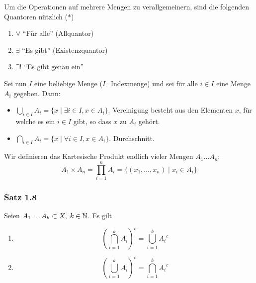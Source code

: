 Um die Operationen auf mehrere Mengen zu verallgemeinern, sind die folgenden Quantoren nützlich ($\ast$)
\begin{enumerate}
\item $\forall$ ``Für alle'' (Allquantor)
\item $\exists$ ``Es gibt'' (Existenzquantor)
\item $\exists !$ ``Es gibt genau ein''
\end{enumerate}
Sei nun $I$ eine beliebige Menge ($I$=Indexmenge) und sei für alle $i\in I$ eine Menge $A_i$ gegeben. Dann:
\begin{itemize}
\item $\mathop{\bigcup}\limits_{i \in I}{A_i} = \{x\mid \exists i\in I,x\in A_i\}$. Vereinigung besteht aus den Elementen $x$, für welche es ein $i\in I$ gibt, so dass $x$ zu $A_i$ gehört.
\item  $\mathop{\bigcap}\limits_{i \in I}{A_i} = \{x\mid \forall i\in I,x\in A_i\}$. Durchschnitt. 
\end{itemize}
Wir definieren das Kartesische Produkt endlich vieler Mengen $A_1 \dots A_n$: \[{A_1} \times {A_n} = \prod\limits_{i = 1}^n {{A_i} = \{ ({x_1}, \ldots, {x_n})\mid {x_i} \in {A_i}} \} \]

\subsubsection*{Satz 1.8}
Seien $A_1 \dots A_k \subset X, \; k\in \mathbb{N}$. Es gilt
\begin{enumerate}
\item \[{\left( {\bigcap\limits_{i = 1}^k {{A_i}} } \right)^c} = \bigcup\limits_{i = 1}^k {{A_i}^c} \]
\item \[{\left( {\bigcup\limits_{i = 1}^k {{A_i}} } \right)^c} = \bigcap\limits_{i = 1}^k {{A_i}^c} \]
\end{enumerate}
